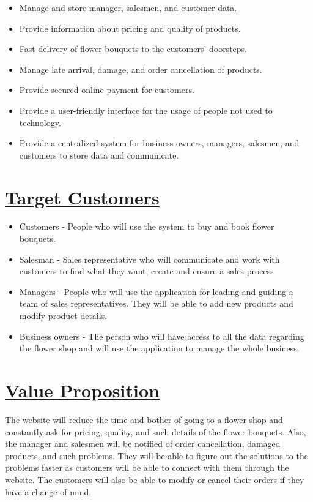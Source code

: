 \documentclass{article}
\begin{document}
\begin{itemize}
    \item Manage and store manager, salesmen, and customer data.
    \item Provide information about pricing and quality of products.
    \item Fast delivery of flower bouquets to the customers' doorsteps.
    \item Manage late arrival, damage, and order cancellation of products.
    \item Provide secured online payment for customers.
    \item Provide a user-friendly interface for the usage of people not used to technology.
    \item Provide a centralized system for business owners, managers, salesmen, and customers to store data and communicate.
\end{itemize}

\section*{\underline{Target Customers}}

\begin{itemize}
    \item Customers - People who will use the system to buy and book flower bouquets.
    \item Salesman - Sales representative who will communicate and work with customers to find what they want, create and ensure a sales process
    \item Managers - People who will use the application for leading and guiding a team of sales representatives. They will be able to add new products and modify product details.
    \item Business owners - The person who will have access to all the data regarding the flower shop and will use the application to manage the whole business. 
\end{itemize}

\section*{\underline{Value Proposition}}

The website will reduce the time and bother of going to a flower shop and constantly ask for pricing, quality, and such details of the flower bouquets. Also, the manager and salesmen will be notified of order cancellation, damaged products, and such problems. They will be able to figure out the solutions to the problems faster as customers will be able to connect with them through the website. The customers will also be able to modify or cancel their orders if they have a change of mind.
\end{document}
